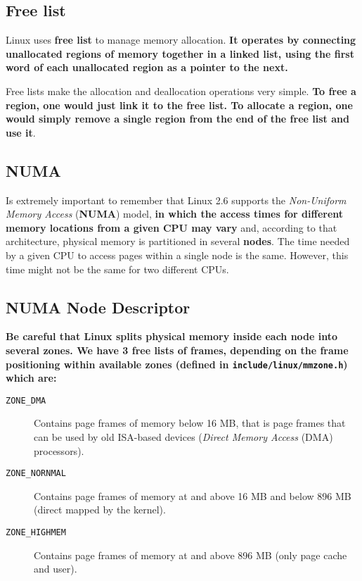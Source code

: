 \documentclass[10pt,a4paper]{article}
\begin{document}
\subsection{Free list}

Linux uses \textbf{free list} to manage memory allocation. \textbf{It operates by connecting unallocated regions of memory together in a linked list, using the first word of each unallocated region as a pointer to the next.} 

Free lists make the allocation and deallocation operations very simple. \textbf{To free a region, one would just link it to the free list. To allocate a region, one would simply remove a single region from the end of the free list and use it}. 

\subsection{NUMA}

Is extremely important to remember that Linux 2.6 supports the \textit{Non-Uniform Memory Access} (\textbf{NUMA}) model, \textbf{in which the access times for different memory locations from a given CPU may vary} and, according to that architecture, physical memory is partitioned in several \textbf{nodes}. The time needed by a given CPU to access pages within a single node is the same. However, this time might not be the same for two different CPUs. 

\subsection{NUMA Node Descriptor}

\textbf{Be careful that Linux splits physical memory inside each node into several zones. We have 3 free lists of frames, depending on the frame positioning within available zones (defined in \texttt{include/linux/mmzone.h}) which are:}

\begin{description}
\item[\texttt{ZONE\_DMA}] Contains page frames of memory below 16 MB, that is page frames that can be used by old ISA-based devices (\textit{Direct Memory Access} (DMA) processors).
\item[\texttt{ZONE\_NORNMAL}] Contains page frames of memory at and above 16 MB and below 896 MB (direct mapped by the kernel).
\item[\texttt{ZONE\_HIGHMEM}] Contains page frames of memory at and above 896 MB (only page cache and user).
\end{description}
\end{document}
